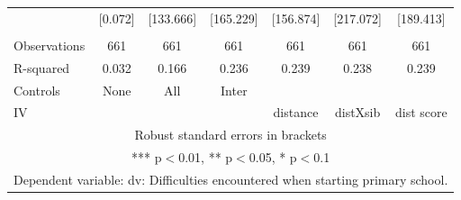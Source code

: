 \begin{tabular}{lcccccc}
 & [0.072] & [133.666] & [165.229] & [156.874] & [217.072] & [189.413] \\
 &  &  &  &  &  &  \\
Observations & 661 & 661 & 661 & 661 & 661 & 661 \\
R-squared & 0.032 & 0.166 & 0.236 & 0.239 & 0.238 & 0.239 \\
Controls & None & All & Inter &  &  &  \\
 IV &  &  &  & distance & distXsib & dist score \\ \hline
\multicolumn{7}{c}{ Robust standard errors in brackets} \\
\multicolumn{7}{c}{ *** p$<$0.01, ** p$<$0.05, * p$<$0.1} \\
\multicolumn{7}{c}{ Dependent variable: dv: Difficulties encountered when starting primary school.} \\
\end{tabular}
